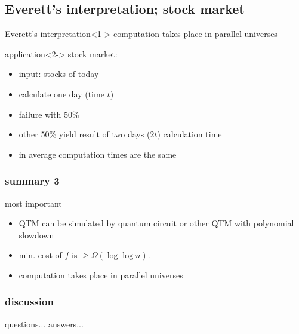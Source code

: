 \documentclass{beamer}
\begin{document}
\subsection{Everett's interpretation; stock market}
\begin{frame}
	\begin{block}{Everett's interpretation}<1->
	    computation takes place in parallel universes
	\end{block}
    \begin{block}{application}<2->
        stock market:
        \begin{itemize}
            \item input: stocks of today
            \item calculate one day (time $t$)
            \item failure with 50\%
            \item other 50\% yield result of two days ($2t$) calculation time
			\item in average computation times are the same
        \end{itemize}
    \end{block}
\end{frame}
%
\begin{frame}
	\frametitle{summary 3}
	\begin{block}{most important}
		\begin{itemize}
		 \item<1-> QTM can be simulated by quantum circuit or other QTM with polynomial slowdown
		 \item<2-> min. cost of $f$ is $\geq\Omega(\log\log n)$.
		 \item<3-> computation takes place in parallel universes
		\end{itemize}
	\end{block}
\end{frame}
%
\begin{frame}
	\tableofcontents
\end{frame}
%
\begin{frame}
	\frametitle{discussion}
	\begin{block}{questions...}
		answers...
	\end{block}
\end{frame}
%
\end{document}
